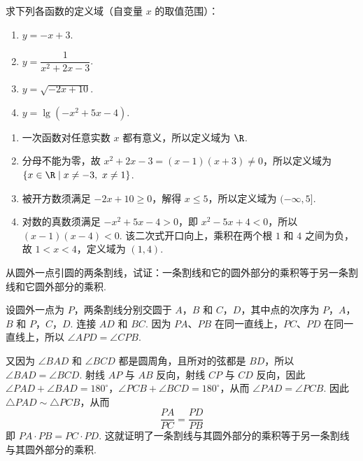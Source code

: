 \begin{problem}
求下列各函数的定义域（自变量 \(x\) 的取值范围）：

\begin{enumerate}
\item \( y=-x+3 \).
\item \( y=\dfrac{1}{x^2+2x-3} \).
\item \( y=\sqrt{-2x+10} \).
\item \( y=\lg\left(-x^2+5x-4\right) \).
\end{enumerate}
\end{problem}

\begin{solution}
\begin{enumerate}
\item 一次函数对任意实数 \(x\) 都有意义，所以定义域为 \(\R\).
\item 分母不能为零，故 \(x^2+2x-3=(x-1)(x+3)\ne0\)，所以定义域为 \(\{x\in\R\mid x\ne-3,\ x\ne1\}\).
\item 被开方数须满足 \(-2x+10\geqslant0\)，解得 \(x\leqslant5\)，所以定义域为 \((-\infty,5]\).
\item 对数的真数须满足 \(-x^2+5x-4>0\)，即 \(x^2-5x+4<0\)，所以 \((x-1)(x-4)<0\). 该二次式开口向上，乘积在两个根 \(1\) 和 \(4\) 之间为负，故 \(1<x<4\)，定义域为 \((1,4)\).
\end{enumerate}
\end{solution}

\begin{problem}
从圆外一点引圆的两条割线，试证：一条割线和它的圆外部分的乘积等于另一条割线和它圆外部分的乘积.
\end{problem}

\begin{solution}
设圆外一点为 \(P\)，两条割线分别交圆于 \(A\)，\(B\) 和 \(C\)，\(D\)，其中点的次序为 \(P\)，\(A\)，\(B\) 和 \(P\)，\(C\)，\(D\). 连接 \(AD\) 和 \(BC\). 因为 \(PA\)、\(PB\) 在同一直线上，\(PC\)、\(PD\) 在同一直线上，所以 \(\angle APD=\angle CPB\).

又因为 \(\angle BAD\) 和 \(\angle BCD\) 都是圆周角，且所对的弦都是 \(BD\)，所以 \(\angle BAD=\angle BCD\). 射线 \(AP\) 与 \(AB\) 反向，射线 \(CP\) 与 \(CD\) 反向，因此
\(\angle PAD+\angle BAD=180^\circ\)，\(\angle PCB+\angle BCD=180^\circ\)，从而 \(\angle PAD=\angle PCB\). 因此 \(\triangle PAD\sim\triangle PCB\)，从而
\[
\frac{PA}{PC}=\frac{PD}{PB}
\]
即 \(PA\cdot PB=PC\cdot PD\). 这就证明了一条割线与其圆外部分的乘积等于另一条割线与其圆外部分的乘积.
\end{solution}


